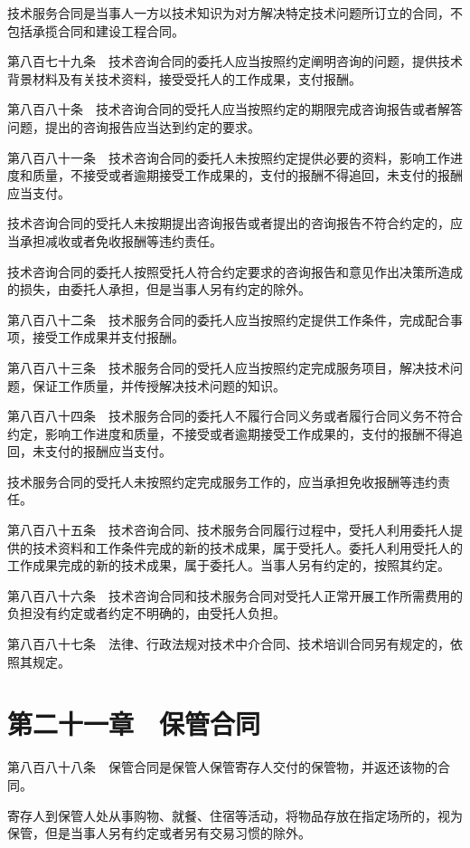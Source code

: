 \documentclass[UTF8,12pt,a4paper]{ctexbook}
\begin{document}
技术服务合同是当事人一方以技术知识为对方解决特定技术问题所订立的合同，不包括承揽合同和建设工程合同。

第八百七十九条　技术咨询合同的委托人应当按照约定阐明咨询的问题，提供技术背景材料及有关技术资料，接受受托人的工作成果，支付报酬。

第八百八十条　技术咨询合同的受托人应当按照约定的期限完成咨询报告或者解答问题，提出的咨询报告应当达到约定的要求。

第八百八十一条　技术咨询合同的委托人未按照约定提供必要的资料，影响工作进度和质量，不接受或者逾期接受工作成果的，支付的报酬不得追回，未支付的报酬应当支付。

技术咨询合同的受托人未按期提出咨询报告或者提出的咨询报告不符合约定的，应当承担减收或者免收报酬等违约责任。

技术咨询合同的委托人按照受托人符合约定要求的咨询报告和意见作出决策所造成的损失，由委托人承担，但是当事人另有约定的除外。

第八百八十二条　技术服务合同的委托人应当按照约定提供工作条件，完成配合事项，接受工作成果并支付报酬。

第八百八十三条　技术服务合同的受托人应当按照约定完成服务项目，解决技术问题，保证工作质量，并传授解决技术问题的知识。

第八百八十四条　技术服务合同的委托人不履行合同义务或者履行合同义务不符合约定，影响工作进度和质量，不接受或者逾期接受工作成果的，支付的报酬不得追回，未支付的报酬应当支付。

技术服务合同的受托人未按照约定完成服务工作的，应当承担免收报酬等违约责任。

第八百八十五条　技术咨询合同、技术服务合同履行过程中，受托人利用委托人提供的技术资料和工作条件完成的新的技术成果，属于受托人。委托人利用受托人的工作成果完成的新的技术成果，属于委托人。当事人另有约定的，按照其约定。

第八百八十六条　技术咨询合同和技术服务合同对受托人正常开展工作所需费用的负担没有约定或者约定不明确的，由受托人负担。

第八百八十七条　法律、行政法规对技术中介合同、技术培训合同另有规定的，依照其规定。

\section*{第二十一章　保管合同}

第八百八十八条　保管合同是保管人保管寄存人交付的保管物，并返还该物的合同。

寄存人到保管人处从事购物、就餐、住宿等活动，将物品存放在指定场所的，视为保管，但是当事人另有约定或者另有交易习惯的除外。
\end{document}
